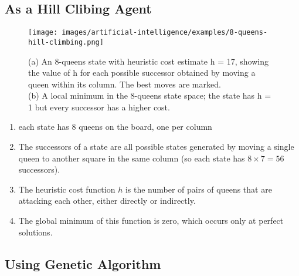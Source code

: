 \subsection{As a Hill Clibing Agent}

\begin{figure}[H]
    \centering
    \texttt{[image: images/artificial-intelligence/examples/8-queens-hill-climbing.png]}
    \caption{
        (a) An 8-queens state with heuristic cost estimate h = 17, showing the value of h for each possible successor obtained by moving a queen within its column. The best moves are marked.
        \hfill \cite{ai/book/Artificial-Intelligence-A-Modern-Approach/Russell-Norvig}
        \\
        (b) A local minimum in the 8-queens state space; the state has h = 1 but every successor has a higher cost.
        \hfill \cite{ai/book/Artificial-Intelligence-A-Modern-Approach/Russell-Norvig}
    }
\end{figure}

\vspace{0.5cm}

\begin{enumerate}
    \item each state has $8$ queens on the board, one per column
    \hfill \cite{ai/book/Artificial-Intelligence-A-Modern-Approach/Russell-Norvig}

    \item The successors of a state are all possible states generated by moving a single queen to another square in the same column (so each state has $8 \times 7 = 56$ successors).
    \hfill \cite{ai/book/Artificial-Intelligence-A-Modern-Approach/Russell-Norvig}

    \item The heuristic cost function $h$ is the number of pairs of queens that are attacking each other, either directly or indirectly.
    \hfill \cite{ai/book/Artificial-Intelligence-A-Modern-Approach/Russell-Norvig}

    \item The global minimum of this function is zero, which occurs only at perfect solutions.
    \hfill \cite{ai/book/Artificial-Intelligence-A-Modern-Approach/Russell-Norvig}
\end{enumerate}



\subsection{Using Genetic Algorithm}


